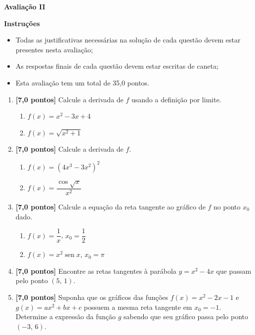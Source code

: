 \documentclass[12pt,a4paper]{article}
\DeclareMathOperator{\sen}{sen}
\begin{document}
\begin{center}
 \textbf{Avaliação II}
\end{center}

\textbf{Instruções}
\begin{itemize}
 \item Todas as justificativas necessárias na solução de cada questão devem estar presentes nesta avaliação;
 \item As respostas finais de cada questão devem estar escritas de caneta;
 \item Esta avaliação tem um total de 35,0 pontos.
\end{itemize}

\begin{enumerate}
  \item \textbf{[7,0 pontos]} Calcule a derivada de $f$ usando a definição por limite.
    \begin{enumerate}
     \item $f(x) = x^2 - 3x + 4$
     \item $f(x) = \sqrt{x^2 + 1}$
    \end{enumerate}

  \item \textbf{[7,0 pontos]} Calcule a derivada de $f$.
    \begin{enumerate}
     \item $f(x) = \left(4x^3 - 3x^2\right)^2$
     \item $f(x) = \dfrac{\cos\sqrt{x}}{x^2}$
    \end{enumerate}

  \item \textbf{[7,0 pontos]} Calcule a equação da reta tangente ao gráfico de $f$
    no ponto $x_0$ dado.
    \begin{enumerate}
     \item $f(x) = \dfrac{1}{x}$, $x_0 = \dfrac{1}{2}$
     \item $f(x) = x^2\sen x$, $x_0 = \pi$
    \end{enumerate}
     
  \item \textbf{[7,0 pontos]} Encontre as retas tangentes à parábola 
    $y = x^2 - 4x$ que passam pelo ponto $(5,\, 1)$.

  \item \textbf{[7,0 pontos]} Suponha que os gráficos das funções
    $f(x) = x^2 - 2x - 1$ e $g(x) = ax^2 + bx + c$ possuem a mesma reta tangente
    em $x_0 = -1$. Determine a expressão da função $g$ sabendo que seu gráfico
    passa pelo ponto $(-3,\, 6)$.
  
  \end{enumerate}
\end{document}
